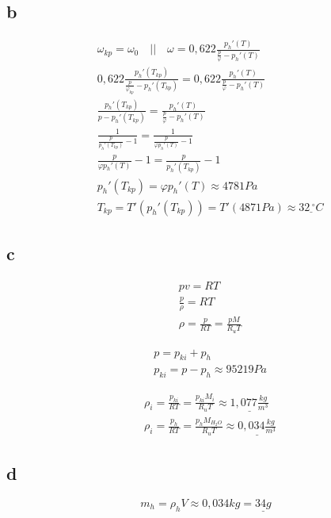 \documentclass[12pt,a4paper,finnish]{article}
\begin{document}
\subsection{b}

\begin{align}
 &\omega_{kp} = \omega_{0} \quad \bigg|\bigg| \quad \omega = 0,622\frac{p_h'(T)}{\frac{p}{\varphi} - p_h'(T)}\\
 &0,622\frac{p_h'(T_{kp})}{\frac{p}{\varphi_{kp}} - p_h'(T_{kp})} = 0,622\frac{p_h'(T)}{\frac{p}{\varphi} - p_h'(T)}\\
 &\frac{p_h'(T_{kp})}{p - p_h'(T_{kp})} = \frac{p_h'(T)}{\frac{p}{\varphi} - p_h'(T)}\\
 &\frac{1}{\frac{p}{p_h'(T_{kp})} - 1} = \frac{1}{\frac{p}{\varphi p_h'(T)} - 1}\\
 &\frac{p}{\varphi p_h'(T)} - 1 = \frac{p}{p_h'(T_{kp})} - 1\\
 &p_h'(T_{kp}) = \varphi p_h'(T) \approx 4781 Pa\\
 &T_{kp} = T'(p_h'(T_{kp})) = T'(4871 Pa) \approx \underline{32 \,^{\circ}C}
\end{align}

\subsection{c}

\begin{align}
 &pv = RT\\
 &\frac{p}{\rho} = RT\\
 &\rho = \frac{p}{RT} = \frac{pM}{R_uT}
\end{align}

\begin{align}
 &p = p_{ki} + p_h\\
 &p_{ki} = p - p_h \approx 95219 Pa
\end{align}

\begin{align}
 &\rho_i = \frac{p_{ki}}{RT} = \frac{p_{ki}M_i}{R_uT} \approx \underline{1,077 \frac{kg}{m^3}}\\
 &\rho_i = \frac{p_{h}}{RT} = \frac{p_{h}M_{H_2O}}{R_uT} \approx \underline{0,034 \frac{kg}{m^3}}
\end{align}

\subsection{d}

\begin{equation}
 m_h = \rho_hV \approx 0,034 kg = \underline{34 g}
\end{equation}
\end{document}
